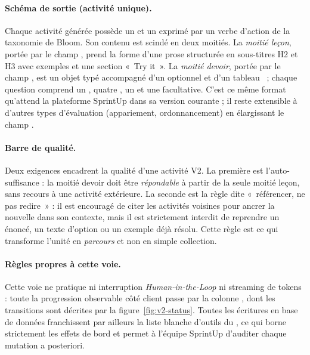 \paragraph{Schéma de sortie (activité unique).} Chaque activité
générée possède un  et un 
exprimé par un verbe d'action de la taxonomie de Bloom. Son contenu
est scindé en deux moitiés. La \emph{moitié leçon}, portée par le
champ , prend la forme d'une prose structurée en
sous-titres H2 et H3 avec exemples et une section «~Try it~». La
\emph{moitié devoir}, portée par le champ ,
est un objet typé  accompagné d'un
 optionnel et d'un tableau ~;
chaque question comprend un , quatre ,
un  et une  facultative.
C'est ce même format qu'attend la plateforme SprintUp dans sa version
courante ; il reste extensible à d'autres types d'évaluation
(appariement, ordonnancement) en élargissant le champ .

\paragraph{Barre de qualité.} Deux exigences encadrent la qualité
d'une activité V2. La première est l'auto-suffisance : la moitié
devoir doit être \emph{répondable} à partir de la seule moitié
leçon, sans recours à une activité extérieure. La seconde est la
règle dite «~référencer, ne pas redire~» : il est encouragé de
citer les activités voisines pour ancrer la nouvelle dans son
contexte, mais il est strictement interdit de reprendre un énoncé,
un texte d'option ou un exemple déjà résolu. Cette règle est ce
qui transforme l'unité en \emph{parcours} et non en simple
collection.

\paragraph{Règles propres à cette voie.} Cette voie ne pratique
ni interruption \emph{Human-in-the-Loop} ni streaming de tokens :
toute la progression observable côté client passe par la colonne
, dont les transitions sont
décrites par la figure~\ref{fig:v2-status}. Toutes les écritures
en base de données franchissent par ailleurs la liste blanche
d'outils du , ce qui borne
strictement les effets de bord et permet à l'équipe SprintUp
d'auditer chaque mutation a posteriori.

